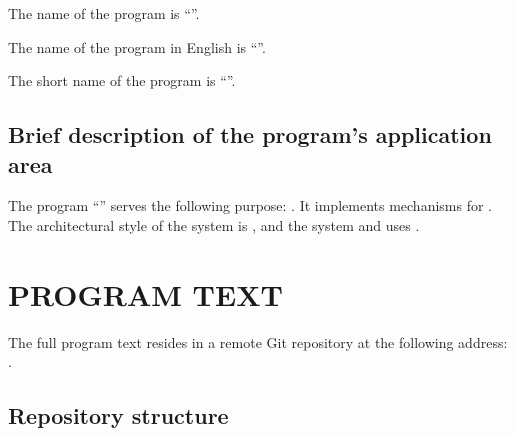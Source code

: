 \documentclass[12pt,a4paper]{extarticle}
\begin{document}
The name of the program is \enquote{\projectname}.

The name of the program in English is \enquote{\hseProjectNameEn}.

The short name of the program is \enquote{\hseProjectNameShort}.

\subsection{Brief description of the program's application area}

The program \enquote{\projectname} serves the following purpose: . It implements mechanisms for . The architectural style of the system is , and the system and uses .

\clearpage

\section{PROGRAM TEXT}

The full program text resides in a remote Git repository at the following address: . 

\subsection{Repository structure}
\end{document}
